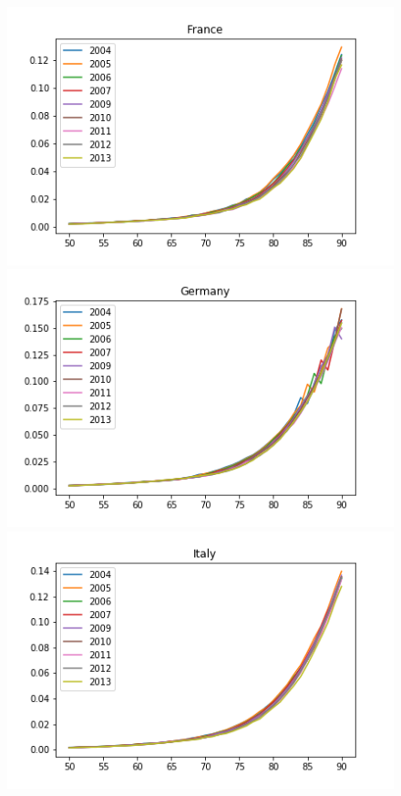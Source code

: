 \begin{figure}[H]
\endminipage \hfill
{}
  \includegraphics[width=\linewidth]{images/mortality_female_4.png}
\endminipage\hfill
{}
  \includegraphics[width=\linewidth]{images/mortality_female_5.png}
\endminipage\hfill
{}%
  \includegraphics[width=\linewidth]{images/mortality_female_6.png}

\end{figure}

